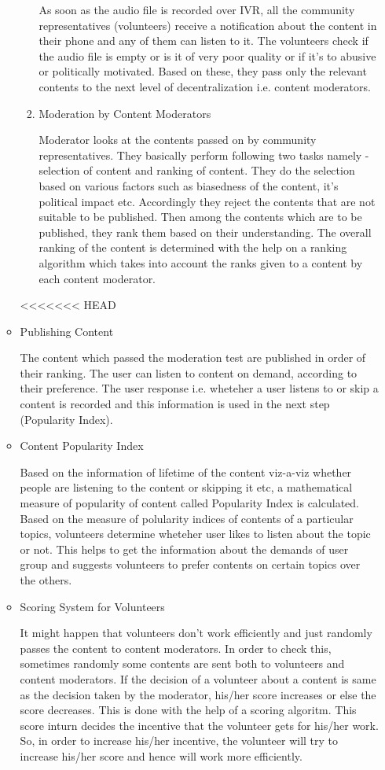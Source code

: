 \documentclass[11pt]{article}
\begin{document}
\begin{itemize}
\begin{itemize}
\begin{enumerate}
			As soon as the audio file is recorded over IVR, all the community representatives (volunteers) receive a notification about the content in their phone and any of them can listen to it. The volunteers check if the audio file is empty or is it of very poor quality or if it's to abusive or politically motivated. Based on these, they pass only the relevant contents to the next level of decentralization i.e. content moderators.


				\item Moderation by Content Moderators


			Moderator looks at the contents passed on by community representatives. They basically perform following two tasks namely - selection of content and ranking of content. They do the selection based on various factors such as biasedness of the content, it's political impact etc. Accordingly they reject the contents that are not suitable to be published. Then among the contents which are to be published, they rank them based on their understanding. The overall ranking of the content is determined with the help on a ranking algorithm which takes into account the ranks given to a content by each content moderator. 
			\end{enumerate}
<<<<<<< HEAD


			\item Publishing Content


			The content which passed the moderation test are published in order of their ranking. The user can listen to content on demand, according to their preference. The user response i.e. wheteher a user listens to or skip a content is recorded and this information is used in the next step (Popularity Index).


			\item Content Popularity Index


			Based on the information of lifetime of the content viz-a-viz whether people are listening to the content or skipping it etc, a mathematical measure of popularity of content called Popularity Index is calculated. Based on the measure of polularity indices of contents of a particular topics, volunteers determine wheteher user likes to listen about the topic or not. This helps to get the information about the demands of user group and suggests volunteers to prefer contents on certain topics over the others.


			\item Scoring System for Volunteers


			It might happen that volunteers don't work efficiently and just randomly passes the content to content moderators. In order to check this, sometimes randomly some contents are sent both to volunteers and content moderators. If the decision of a volunteer about a content is same as the decision taken by the moderator, his/her score increases or else the score decreases. This is done with the help of a scoring algoritm. This score inturn decides the incentive that the volunteer gets for his/her work. So, in order to increase his/her incentive, the volunteer will try to increase his/her score and hence will work more efficiently.



\end{itemize}
\end{itemize}
\end{document}
